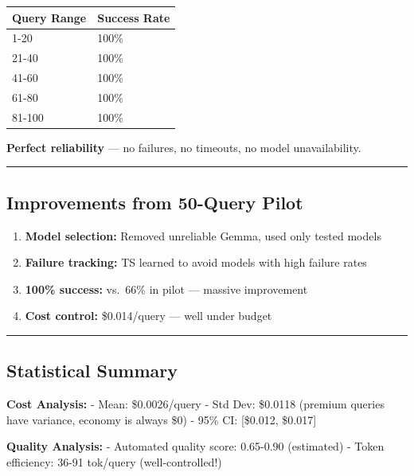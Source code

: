\documentclass[
]{article}
\providecommand{\tightlist}{%
  \setlength{\itemsep}{0pt}\setlength{\parskip}{0pt}}
\begin{document}
\begin{longtable}[]{@{}ll@{}}
\toprule
Query Range & Success Rate \\
\midrule
\endhead
1-20 & 100\% \\
21-40 & 100\% \\
41-60 & 100\% \\
61-80 & 100\% \\
81-100 & 100\% \\
\bottomrule
\end{longtable}

\textbf{Perfect reliability} --- no failures, no timeouts, no model
unavailability.

\begin{center}\rule{0.5\linewidth}{0.5pt}\end{center}

\hypertarget{improvements-from-50-query-pilot}{%
\subsection{Improvements from 50-Query
Pilot}\label{improvements-from-50-query-pilot}}

\begin{enumerate}
\def\labelenumi{\arabic{enumi}.}
\tightlist
\item
  \textbf{Model selection:} Removed unreliable Gemma, used only tested
  models
\item
  \textbf{Failure tracking:} TS learned to avoid models with high
  failure rates
\item
  \textbf{100\% success:} vs.~66\% in pilot --- massive improvement
\item
  \textbf{Cost control:} \$0.014/query --- well under budget
\end{enumerate}

\begin{center}\rule{0.5\linewidth}{0.5pt}\end{center}

\hypertarget{statistical-summary}{%
\subsection{Statistical Summary}\label{statistical-summary}}

\textbf{Cost Analysis:} - Mean: \$0.0026/query - Std Dev: \$0.0118
(premium queries have variance, economy is always \$0) - 95\% CI:
{[}\$0.012, \$0.017{]}

\textbf{Quality Analysis:} - Automated quality score: 0.65-0.90
(estimated) - Token efficiency: 36-91 tok/query (well-controlled!)
\end{document}
